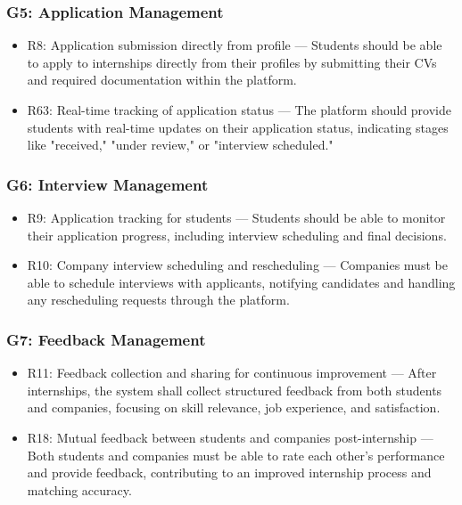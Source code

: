 \subsubsection{G5: Application Management}
    \begin{itemize}
        \item R8: Application submission directly from profile — Students should be able to apply to internships directly from their profiles by submitting their CVs and required documentation within the platform.
        \item R63: Real-time tracking of application status — The platform should provide students with real-time updates on their application status, indicating stages like "received," "under review," or "interview scheduled."
    \end{itemize}

\subsubsection{G6: Interview Management}
    \begin{itemize}
        \item R9: Application tracking for students — Students should be able to monitor their application progress, including interview scheduling and final decisions.
        \item R10: Company interview scheduling and rescheduling — Companies must be able to schedule interviews with applicants, notifying candidates and handling any rescheduling requests through the platform.
    \end{itemize}
    
\subsubsection{G7: Feedback Management}
    \begin{itemize}
        \item R11: Feedback collection and sharing for continuous improvement — After internships, the system shall collect structured feedback from both students and companies, focusing on skill relevance, job experience, and satisfaction.
        \item R18: Mutual feedback between students and companies post-internship — Both students and companies must be able to rate each other’s performance and provide feedback, contributing to an improved internship process and matching accuracy.
    \end{itemize}

